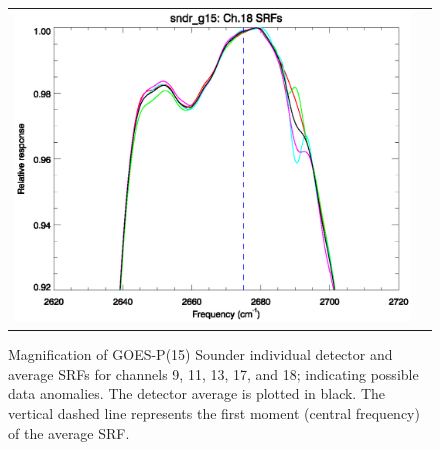 \begin{figure}[htp]
\begin{tabular}{c c}
    \includegraphics[scale=0.5]{graphics/zoom_anomaly/sndr_g15.ch18.srf.eps} &
  \end{tabular}
  \caption{Magnification of GOES-P(15) Sounder individual detector and average SRFs for channels 9, 11, 13, 17, and 18; indicating possible data anomalies. The detector average is plotted in black. The vertical dashed line represents the first moment (central frequency) of the average SRF.}
  \label{fig:sndr_g15.zoom_anomaly}
\end{figure}


\begin{appendix}
  
  
\end{appendix}



